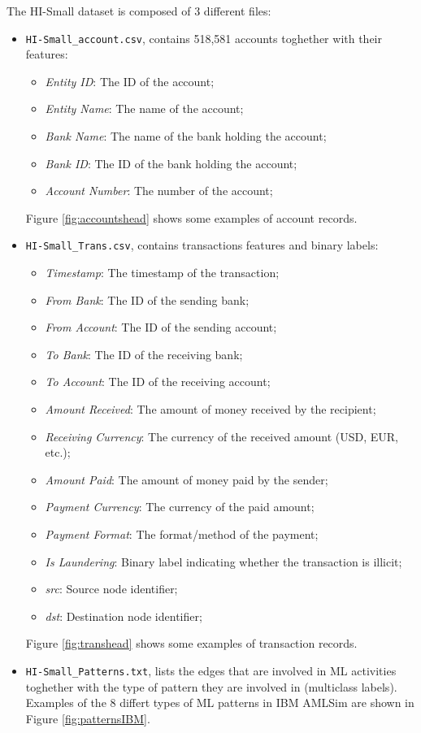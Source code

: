The HI-Small dataset is composed of 3 different files:
\begin{itemize}
    \item \texttt{HI-Small\_account.csv}, contains 518,581 accounts toghether with their features:
    \begin{itemize}
        \item \textit{Entity ID}: The ID of the account;
        \item \textit{Entity Name}: The name of the account;
        \item \textit{Bank Name}: The name of the bank holding the account; 
        \item \textit{Bank ID}: The ID of the bank holding the account;
        \item \textit{Account Number}: The number of the account;    
    \end{itemize}
    Figure \ref{fig:accountshead} shows some examples of account records.
    \item \texttt{HI-Small\_Trans.csv}, contains transactions features and binary labels:
    \begin{itemize}
        \item \textit{Timestamp}: The timestamp of the transaction;
        \item \textit{From Bank}: The ID of the sending bank;
        \item \textit{From Account}: The ID of the sending account;
        \item \textit{To Bank}: The ID of the receiving bank;
        \item \textit{To Account}: The ID of the receiving account;
        \item \textit{Amount Received}: The amount of money received by the recipient;
        \item \textit{Receiving Currency}: The currency of the received amount (USD, EUR, etc.);
        \item \textit{Amount Paid}: The amount of money paid by the sender;
        \item \textit{Payment Currency}: The currency of the paid amount;
        \item \textit{Payment Format}: The format/method of the payment;
        \item \textit{Is Laundering}: Binary label indicating whether the transaction is illicit;
        \item \textit{src}: Source node identifier;
        \item \textit{dst}: Destination node identifier;
    \end{itemize}
    Figure \ref{fig:transhead} shows some examples of transaction records.
    \item \texttt{HI-Small\_Patterns.txt}, lists the edges that are involved in ML activities toghether with the type of pattern they are involved in (multiclass labels).
    Examples of the 8 differt types of ML patterns in IBM AMLSim are shown in Figure \ref{fig:patternsIBM}.
\end{itemize}
